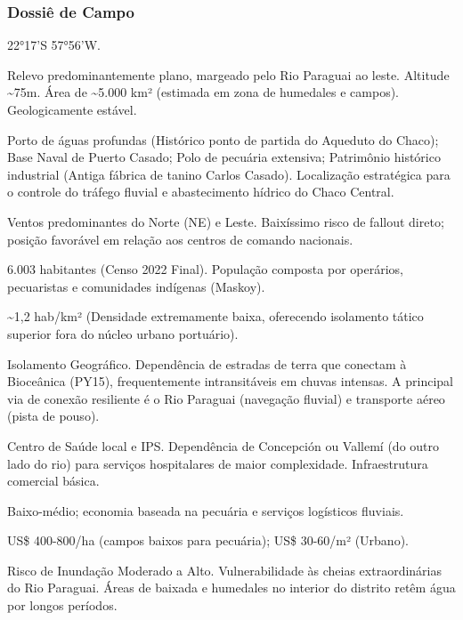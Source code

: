 \subsubsection{Dossiê de Campo}
\begin{description}[style=nextline,leftmargin=0.5cm,font=\bfseries]
\item[Coordenadas]  22°17'S 57°56'W.
\item[Topografia]  Relevo predominantemente plano, margeado pelo Rio Paraguai ao leste. Altitude \textasciitilde 75m. Área de \textasciitilde 5.000 km² (estimada em zona de humedales e campos). Geologicamente estável.
\item[Alvos Estratégicos]  Porto de águas profundas (Histórico ponto de partida do Aqueduto do Chaco); Base Naval de Puerto Casado; Polo de pecuária extensiva; Patrimônio histórico industrial (Antiga fábrica de tanino Carlos Casado). Localização estratégica para o controle do tráfego fluvial e abastecimento hídrico do Chaco Central.
\item[Fallout]  Ventos predominantes do Norte (NE) e Leste. Baixíssimo risco de fallout direto; posição favorável em relação aos centros de comando nacionais.
\item[População]  6.003 habitantes (Censo 2022 Final). População composta por operários, pecuaristas e comunidades indígenas (Maskoy).
\item[Densidade]  \textasciitilde 1,2 hab/\allowbreak km² (Densidade extremamente baixa, oferecendo isolamento tático superior fora do núcleo urbano portuário).
\item[Vias de Acesso]  Isolamento Geográfico. Dependência de estradas de terra que conectam à Bioceânica (PY15), frequentemente intransitáveis em chuvas intensas. A principal via de conexão resiliente é o Rio Paraguai (navegação fluvial) e transporte aéreo (pista de pouso).
\item[Serviços]  Centro de Saúde local e IPS. Dependência de Concepción ou Vallemí (do outro lado do rio) para serviços hospitalares de maior complexidade. Infraestrutura comercial básica.
\item[Custo de Vida]  Baixo-médio; economia baseada na pecuária e serviços logísticos fluviais.
\item[Preço da Terra]  US\$ 400-800/\allowbreak ha (campos baixos para pecuária); US\$ 30-60/\allowbreak m² (Urbano).
\item[Hidrologia]  Risco de Inundação Moderado a Alto. Vulnerabilidade às cheias extraordinárias do Rio Paraguai. Áreas de baixada e humedales no interior do distrito retêm água por longos períodos.

\end{description}
